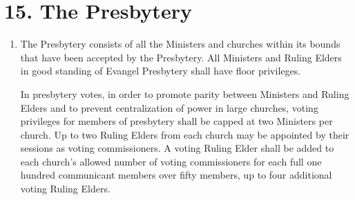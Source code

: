 \documentclass[
]{book}
\begin{document}
\hypertarget{the-presbytery}{%
\section*{15. The Presbytery}\label{the-presbytery}}

\protect\hypertarget{chapter-slug-15-the-presbytery}{\href{}{}}

\begin{enumerate}
\def\labelenumi{\arabic{enumi}.}
\item
  \protect\hypertarget{15}{\href{}{}}\protect\hypertarget{15.1}{\href{}{}}The Presbytery consists of all the Ministers and churches within its bounds that have been accepted by the Presbytery. All Ministers and Ruling Elders in good standing of Evangel Presbytery shall have floor privileges.

  In presbytery votes, in order to promote parity between Ministers and Ruling Elders and to prevent centralization of power in large churches, voting privileges for members of presbytery shall be capped at two Ministers per church. Up to two Ruling Elders from each church may be appointed by their sessions as voting commissioners. A voting Ruling Elder shall be added to each church's allowed number of voting commissioners for each full one hundred communicant members over fifty members, up to four additional voting Ruling Elders.


\end{enumerate}
\end{document}
